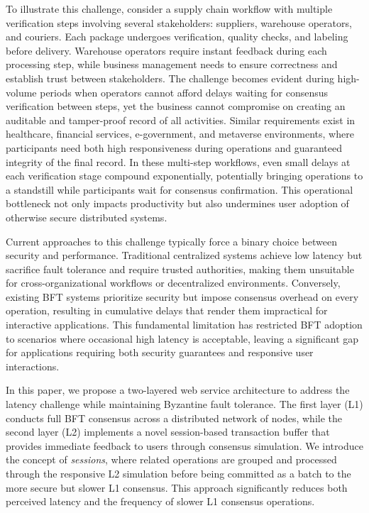 \documentclass[conference]{IEEEtran}
\begin{document}
To illustrate this challenge, consider a supply chain workflow with multiple verification steps involving several stakeholders: suppliers, warehouse operators, and couriers. Each package undergoes verification, quality checks, and labeling before delivery. Warehouse operators require instant feedback during each processing step, while business management needs to ensure correctness and establish trust between stakeholders. The challenge becomes evident during high-volume periods when operators cannot afford delays waiting for consensus verification between steps, yet the business cannot compromise on creating an auditable and tamper-proof record of all activities. Similar requirements exist in healthcare, financial services, e-government, and metaverse environments, where participants need both high responsiveness during operations and guaranteed integrity of the final record. In these multi-step workflows, even small delays at each verification stage compound exponentially, potentially bringing operations to a standstill while participants wait for consensus confirmation. This operational bottleneck not only impacts productivity but also undermines user adoption of otherwise secure distributed systems.

Current approaches to this challenge typically force a binary choice between security and performance. Traditional centralized systems achieve low latency but sacrifice fault tolerance and require trusted authorities, making them unsuitable for cross-organizational workflows or decentralized environments. Conversely, existing BFT systems prioritize security but impose consensus overhead on every operation, resulting in cumulative delays that render them impractical for interactive applications. This fundamental limitation has restricted BFT adoption to scenarios where occasional high latency is acceptable, leaving a significant gap for applications requiring both security guarantees and responsive user interactions.

In this paper, we propose a two-layered web service architecture to address the latency challenge while maintaining Byzantine fault tolerance. The first layer (L1) conducts full BFT consensus across a distributed network of nodes, while the second layer (L2) implements a novel session-based transaction buffer that provides immediate feedback to users through consensus simulation. We introduce the concept of \textit{sessions}, where related operations are grouped and processed through the responsive L2 simulation before being committed as a batch to the more secure but slower L1 consensus. This approach significantly reduces both perceived latency and the frequency of slower L1 consensus operations.
\end{document}
